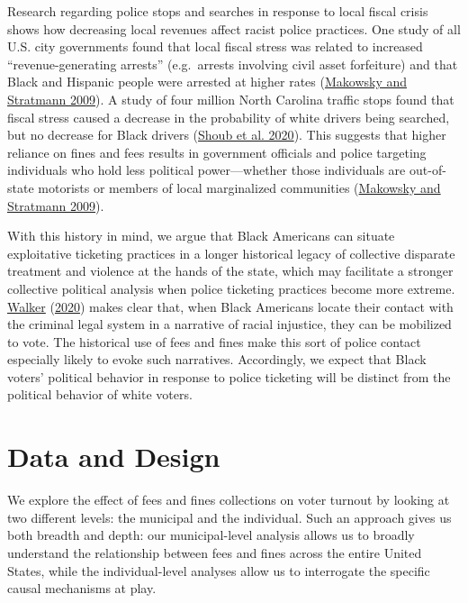 \documentclass[
  12pt,
]{article}
\begin{document}
Research regarding police stops and searches in response to local fiscal crisis shows how decreasing local revenues affect racist police practices. One study of all U.S. city governments found that local fiscal stress was related to increased ``revenue-generating arrests'' (e.g.~arrests involving civil asset forfeiture) and that Black and Hispanic people were arrested at higher rates (\protect\hyperlink{ref-Makowsky2009}{Makowsky and Stratmann 2009}). A study of four million North Carolina traffic stops found that fiscal stress caused a decrease in the probability of white drivers being searched, but no decrease for Black drivers (\protect\hyperlink{ref-Shoub2020}{Shoub et al. 2020}). This suggests that higher reliance on fines and fees results in government officials and police targeting individuals who hold less political power---whether those individuals are out-of-state motorists or members of local marginalized communities (\protect\hyperlink{ref-Makowsky2009}{Makowsky and Stratmann 2009}).

With this history in mind, we argue that Black Americans can situate exploitative ticketing practices in a longer historical legacy of collective disparate treatment and violence at the hands of the state, which may facilitate a stronger collective political analysis when police ticketing practices become more extreme. \protect\hyperlink{ref-Walker2020}{Walker} (\protect\hyperlink{ref-Walker2020}{2020}) makes clear that, when Black Americans locate their contact with the criminal legal system in a narrative of racial injustice, they can be mobilized to vote. The historical use of fees and fines make this sort of police contact especially likely to evoke such narratives. Accordingly, we expect that Black voters' political behavior in response to police ticketing will be distinct from the political behavior of white voters.

\hypertarget{data-and-design}{%
\section*{Data and Design}\label{data-and-design}}

We explore the effect of fees and fines collections on voter turnout by looking at two different levels: the municipal and the individual. Such an approach gives us both breadth and depth: our municipal-level analysis allows us to broadly understand the relationship between fees and fines across the entire United States, while the individual-level analyses allow us to interrogate the specific causal mechanisms at play.
\end{document}
